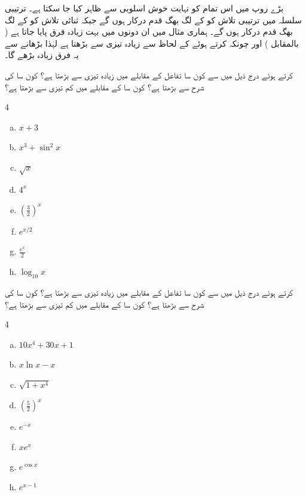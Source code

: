 بڑے  روپ میں اس تمام کو نہایت خوش اسلوبی سے ظاہر کیا جا سکتا ہے۔ ترتیبی سلسلہ میں ترتیبی تلاش کو  کے لگ بھگ قدم درکار ہوں گے جبکہ ثنائی تلاش کو  کے لگ بھگ قدم درکار ہوں گے۔ ہماری مثال میں ان  دونوں میں بہت زیادہ فرق پایا جاتا ہے ( بالمقابل ) اور چونکہ  کرتے ہوئے  کے لحاظ سے  زیادہ تیزی سے بڑھتا ہے لہٰذا  بڑھانے سے یہ فرق زیادہ بڑھے گا۔




 کرتے ہوئے درج ذیل میں سے کون سا تفاعل   کے مقابلے میں  زیادہ تیزی سے بڑھتا ہے؟ کون سا  کی شرح سے بڑھتا ہے؟  کون سا   کے مقابلے میں  کم تیزی سے بڑھتا ہے؟
\begin{multicols}{4}
\begin{enumerate}[a.]
\item
$x+3$
\item
$x^3+\sin^2x$
\item
$\sqrt{x}$
\item
$4^x$
\item
$(\tfrac{3}{2})^x$
\item
$e^{x/2}$
\item
$\frac{e^x}{2}$
\item
$\log_{10}x$
\end{enumerate}
\end{multicols}
 کرتے ہوئے درج ذیل میں سے کون سا تفاعل  کے مقابلے میں زیادہ تیزی سے بڑھتا ہے؟ کون سا  کی شرح سے بڑھتا ہے؟  کون سا  کے مقابلے میں کم تیزی سے بڑھتا ہے؟
\begin{multicols}{4}
\begin{enumerate}[a.]
\item
$10x^4+30x+1$
\item
$x\ln x-x$
\item
$\sqrt{1+x^4}$
\item
$(\tfrac{5}{2})^x$
\item
$e^{-x}$
\item
$xe^x$
\item
$e^{\cos x}$
\item
$e^{x-1}$
\end{enumerate}
\end{multicols}

